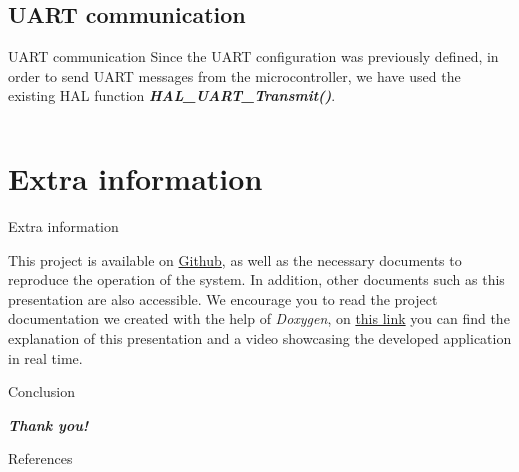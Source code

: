 \documentclass[aspectratio=169]{beamer}
\newcommand{\inputCcode}[2][c]{\inputminted[frame=lines,
                                           framesep=2mm,
                                           baselinestretch=1.2,
                                           bgcolor=black!5,
                                           linenos,
                                           fontsize=\scriptsize,
                                           obeytabs=true,
                                           tabsize=4
                                           ]{#1}{#2}}
\begin{document}
\subsection{UART communication}
\begin{frame}[fragile]{UART communication}
    Since the UART configuration was previously defined, in order to send UART messages from the microcontroller, we have used the existing HAL function \textbf{\textit{HAL\_UART\_Transmit()}}. 
    \inputCcode{Code/uart.c}
\end{frame}

\section{Extra information}
\begin{frame}{Extra information}

    This project is available on \href{https://github.com/anacalo24/MicroProject}{Github}, as well as the necessary documents to reproduce the operation of the system. In addition, other documents such as this presentation are also accessible. We encourage you to read the project documentation we created with the help of \textit{Doxygen}, on \href{}{this link} you can find the explanation of this presentation and a video showcasing the developed application in real time.

    
\end{frame}


\begin{frame}[fragile]{Conclusion}
    \begin{center}
    \textit{\textbf{\LARGE Thank you!}}
    \end{center}
\end{frame}



\begin{frame}{References}
    \printbibliography[heading=none]
\end{frame}
\end{document}
